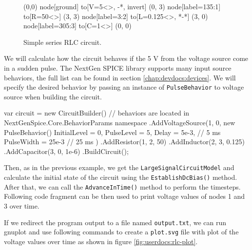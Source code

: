 \begin{figure}[h]
	\centering
	\begin{circuitdev}
		(0,0) node[ground]{}
		to[V=5<\volt>, -*, invert] (0, 3) node[label=135:1]{}
		to[R=50<\ohm>] (3, 3) node[label=3:2]{}
		to[L=0.125<\henry>, *-*] (3, 0) node[label=305:3]{}
		to[C=1<\micro\farad>] (0, 0)
	\end{circuitdev}
	\caption{Simple series RLC circuit.}
	\label{fig:userdocs:rlc-circuit}
\end{figure}

We will calculate how the circuit behaves if the 5 V from the voltage source come in a sudden pulse. The NextGen SPICE library supports many input source behaviors, the full list can be found in section \ref{chap:devdocs:devices}. We will specify the desired behavior by passing an instance of \texttt{PulseBehavior} to voltage source when building the circuit. 

\begin{csharpcode}
var circuit = new CircuitBuilder()
	// behaviors are located in NextGenSpice.Core.BehaviorParams namespace
	.AddVoltageSource(1, 0, new PulseBehavior()
	{
		InitialLevel = 0,
		PulseLevel = 5,
		Delay = 5e-3, // 5 ms
		PulseWidth = 25e-3 // 25 ms
	})
	.AddResistor(1, 2, 50)
	.AddInductor(2, 3, 0.125)
	.AddCapacitor(3, 0, 1e-6)
	.BuildCircuit();
\end{csharpcode}

Then, as in the previous example, we get the \texttt{LargeSignalCircuitModel} and calculate the initial state of the circuit using the \texttt{EstablishDcBias()} method. After that, we can call the \texttt{AdvanceInTime()} method to perform the timesteps. Following code fragment can be then used to print voltage values of nodes 1 and 3 over time.


If we redirect the program output to a file named \texttt{output.txt}, we can run gnuplot and use following commands to create a \texttt{plot.svg} file with plot of the voltage values over time as shown in figure \ref{fig:userdocs:rlc-plot}.

